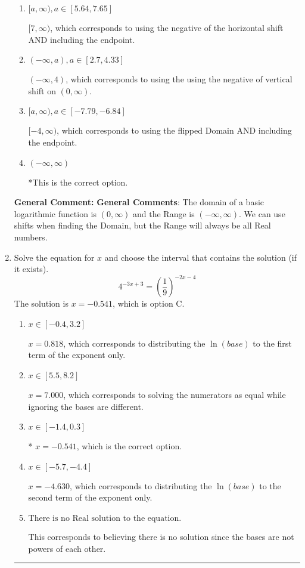 \documentclass{extbook}[14pt]
\newcommand{\litem}[1]{\item #1

\rule{\textwidth}{0.4pt}}
\begin{document}
\begin{enumerate}
{\begin{enumerate}[label=\Alph*.]
$(-\infty, -4)$, which corresponds to using the vertical shift while the Range is $(-\infty, \infty)$.
\item \( [a, \infty), a \in [5.64, 7.65] \)

$[7, \infty)$, which corresponds to using the negative of the horizontal shift AND including the endpoint.
\item \( (-\infty, a), a \in [2.7, 4.33] \)

$(-\infty, 4)$, which corresponds to using the using the negative of vertical shift on $(0, \infty)$.
\item \( [a, \infty), a \in [-7.79, -6.84] \)

$[-4, \infty)$, which corresponds to using the flipped Domain AND including the endpoint.
\item \( (-\infty, \infty) \)

*This is the correct option.
\end{enumerate}

\textbf{General Comment:} \textbf{General Comments}: The domain of a basic logarithmic function is $(0, \infty)$ and the Range is $(-\infty, \infty)$. We can use shifts when finding the Domain, but the Range will always be all Real numbers.
}
\litem{
Solve the equation for $x$ and choose the interval that contains the solution (if it exists).
\[ 4^{-3x+3} = \left(\frac{1}{9}\right)^{-2x-4} \]The solution is \( x = -0.541 \), which is option C.\begin{enumerate}[label=\Alph*.]
\item \( x \in [-0.4, 3.2] \)

$x = 0.818$, which corresponds to distributing the $\ln(base)$ to the first term of the exponent only.
\item \( x \in [5.5, 8.2] \)

$x = 7.000$, which corresponds to solving the numerators as equal while ignoring the bases are different.
\item \( x \in [-1.4, 0.3] \)

* $x = -0.541$, which is the correct option.
\item \( x \in [-5.7, -4.4] \)

$x = -4.630$, which corresponds to distributing the $\ln(base)$ to the second term of the exponent only.
\item \( \text{There is no Real solution to the equation.} \)

This corresponds to believing there is no solution since the bases are not powers of each other.
\end{enumerate}

}
\end{enumerate}
\end{document}
